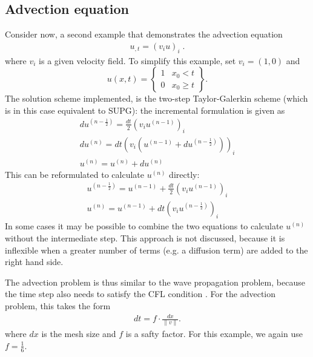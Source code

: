 \subsection{Advection equation}
Consider now, a second example that demonstrates the advection equation
\begin{eqnarray} \label{LUMPING ADVECTIVE} 
u_{,t}=(v_i u)_i \; .
\end{eqnarray}
where $v_i$ is a given velocity field. To simplify this example, set $v_i=(1,0)$ and
\begin{equation} \label{LUMPING ADVECTIVE TEST} 
u(x,t)= 
\left\{
   \begin{array}{cl}
   1 &  x_0 < t \\
   0 &  x_0 \ge t 
   \end{array}
\right\}.
\end{equation}
The solution scheme implemented, is the two-step Taylor-Galerkin scheme 
(which is in this case equivalent to SUPG):
the incremental formulation is given as
\begin{eqnarray} \label{LUMPING SUPG 1} 
du^{(n-\frac{1}{2})} = \frac{dt}{2} (v_i u^{(n-1)})_i \\
du^{(n)} = dt (v_i (u^{(n-1)}+du^{(n-\frac{1}{2})}) )_i \\
u^{(n)} = u^{(n)} + du^{(n)} 
\end{eqnarray}
This can be reformulated to calculate $u^{(n)}$ directly:
\begin{eqnarray} \label{LUMPING SUPG 2} 
u^{(n-\frac{1}{2})} = u^{(n-1)} + \frac{dt}{2} (v_i u^{(n-1)})_i \\
u^{(n)} =  u^{(n-1)} + dt (v_i u^{(n-\frac{1}{2})} )_i 
\end{eqnarray}
In some cases it may be possible to combine the two equations to calculate 
$u^{(n)}$ without the intermediate step. This approach is not discussed, because
 it is inflexible when a greater number of terms (e.g. a diffusion term) are
 added to the right hand side. 

The advection problem is thus similar to the wave propagation problem, because 
the time step also needs to satisfy the CFL condition
. For the 
advection problem, this takes the form
\begin{eqnarray} \label{LUMPING ADVECTION CFL} 
dt = f \cdot \frac{dx}{\|v\|} .
\end{eqnarray}
where $dx$ is the mesh size and $f$ is a safty factor. 
For this example, we again use $f=\frac{1}{6}$.


